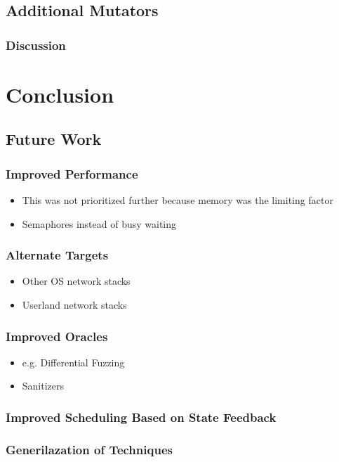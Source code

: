 \documentclass[twocolumn]{article}
\begin{document}
\subsection{Additional Mutators}
\subsubsection{Discussion}


\section{Conclusion}
\label{Conclusion}
\subsection{Future Work}
\subsubsection{Improved Performance}
\begin{itemize}
  \item This was not prioritized further because memory was the limiting factor
  \item Semaphores instead of busy waiting
\end{itemize}
\subsubsection{Alternate Targets}
\begin{itemize}
  \item Other OS network stacks
  \item Userland network stacks
\end{itemize}
\subsubsection{Improved Oracles}
\begin{itemize}
  \item e.g. Differential Fuzzing
  \item Sanitizers
\end{itemize}
\subsubsection{Improved Scheduling Based on State Feedback}
\subsubsection{Generilazation of Techniques}
\end{document}
